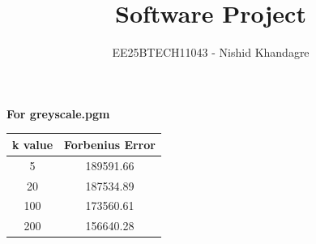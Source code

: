 \documentclass[journal]{IEEEtran}
\title{Software Project}
\author{EE25BTECH11043 - Nishid Khandagre}
\begin{document}
\maketitle

\renewcommand{\thefigure}{\theenumi}
\renewcommand{\thetable}{\theenumi}

\textbf{For greyscale.pgm}

\begin{table}[H]
    \centering
    \begin{tabular}{|c|c|}
        \hline
        \textbf{k value} & \textbf{Forbenius Error} \\  
     \hline
        5 & 189591.66 \\                              
        \hline
        20 & 187534.89 \\                         
        \hline
        100 & 173560.61 \\       
        \hline
        200 & 156640.28 \\       
        \hline
    \end{tabular}
    \label{tab:3}
\end{table}
\end{document}
